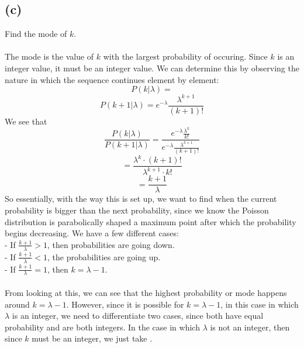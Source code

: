\documentclass{article}
\begin{document}
{\subsection*{(c)}
Find the mode of \(k\). \\ \\
The mode is the value of \(k\) with the largest probability of occuring. Since \(k\) is an integer value, it must be an integer value. We can determine this by observing the nature in which the sequence continues element by element:
\[
  P(k | \lambda) = 
\]
\[
  P(k + 1 | \lambda) = e^{-\lambda} \frac{\lambda^{k+1}}{(k+1)!}
\]
We see that 
\[
  \frac{P(k | \lambda)}{P(k + 1 | \lambda)} = \frac{e^{-\lambda} \frac{\lambda^k}{k!}}{e^{-\lambda} \frac{\lambda^{k+1}}{(k+1)!}}
\]
\[
  = \frac{\lambda^k \cdot (k+1)!}{\lambda^{k+1} \cdot k!}
\]
\[
  = \frac{k + 1}{\lambda}
\]
So essentially, with the way this is set up, we want to find when the current probability is bigger than the next probability, since we know the Poisson distribution is parabolically shaped a maximum point after which the probability begins decreasing. We have a few different cases: \\ 
- If \(\frac{k+1}{\lambda} > 1\), then probabilities are going down. \\ 
- If \(\frac{k+1}{\lambda} < 1\), the probabilities are going up. \\
- If \(\frac{k+1}{\lambda} = 1\), then \(k = \lambda - 1\). \\ \\
From looking at this, we can see that the highest probability or mode happens around \(k = \lambda - 1\). However, since it is possible for \(k = \lambda - 1\), in this case in which \(\lambda\) is an integer, we need to differentiate two cases, since both  have equal probability and are both integers. In the case in which \(\lambda\) is not an integer, then since \(k\) must be an integer, we just take .

}
\end{document}
